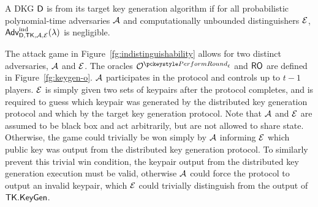 \begin{definition}
A DKG $\mathsf{D}$ is  from its target key generation algorithm if
for all probabilistic polynomial-time adversaries $\mathcal{A}$ and computationally unbounded distinguishers $\mathcal{E}$,
$\textsf{\upshape Adv}^{\textrm{\upshape ind}}_{\mathsf{D},\mathsf{TK},\mathcal{A},\mathcal{E}}(\lambda)$  is negligible.
\end{definition}

The attack game in Figure~\ref{fg:indistinguishability} allows for two distinct adversaries, $\mathcal{A}$ and $\mathcal{E}$.
The oracles $\oraclekg$ and $\mathsf{RO}$ are defined in Figure~\ref{fg:keygen-o}.
$\mathcal{A}$ participates in the protocol and controls up to $t-1$ players.
$\mathcal{E}$ is simply given two sets of keypairs after the protocol completes,
and is required to guess which keypair was generated by the distributed key generation protocol and which by the target key generation protocol.
Note that $\mathcal{A}$ and $\mathcal{E}$ are assumed to be black box and act arbitrarily,
but are not allowed to share state.
Otherwise, the game could trivially be won simply by $\mathcal{A}$
informing $\mathcal{E}$ which public key was output from the distributed key generation protocol.
To similarly prevent this trivial win condition,
the keypair output from the distributed key generation execution must be valid,
otherwise $\mathcal{A}$ could force the protocol to output an invalid keypair,
which $\mathcal{E}$ could trivially distinguish from the output of $\mathsf{TK}.\mathsf{KeyGen}$.

